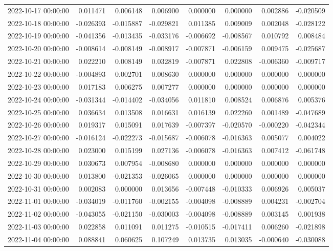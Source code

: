 \begin{tabular}{lrrrrrrr}
2022-10-17 00:00:00 & 0.011471 & 0.006148 & 0.006900 & 0.000000 & 0.000000 & 0.002886 & -0.020509 \\
2022-10-18 00:00:00 & -0.026393 & -0.015887 & -0.029821 & 0.011385 & 0.009009 & 0.002048 & -0.028122 \\
2022-10-19 00:00:00 & -0.041356 & -0.013435 & -0.033176 & -0.006692 & -0.008567 & 0.010792 & 0.008484 \\
2022-10-20 00:00:00 & -0.008614 & -0.008149 & -0.008917 & -0.007871 & -0.006159 & 0.009475 & -0.025687 \\
2022-10-21 00:00:00 & 0.022210 & 0.008149 & 0.032819 & -0.007871 & 0.022808 & -0.006360 & -0.009717 \\
2022-10-22 00:00:00 & -0.004893 & 0.002701 & 0.008630 & 0.000000 & 0.000000 & 0.000000 & 0.000000 \\
2022-10-23 00:00:00 & 0.017183 & 0.006275 & 0.007277 & 0.000000 & 0.000000 & 0.000000 & 0.000000 \\
2022-10-24 00:00:00 & -0.031344 & -0.014402 & -0.034056 & 0.011810 & 0.008524 & 0.006876 & 0.005376 \\
2022-10-25 00:00:00 & 0.036634 & 0.013508 & 0.016631 & 0.016139 & 0.022260 & 0.001489 & -0.047689 \\
2022-10-26 00:00:00 & 0.019317 & 0.015091 & 0.017639 & -0.007397 & -0.020570 & -0.000220 & -0.042344 \\
2022-10-27 00:00:00 & -0.016124 & -0.022273 & -0.015687 & -0.006078 & -0.016363 & 0.005077 & 0.004022 \\
2022-10-28 00:00:00 & 0.023000 & 0.015199 & 0.027136 & -0.006078 & -0.016363 & 0.007412 & -0.061748 \\
2022-10-29 00:00:00 & 0.030673 & 0.007954 & -0.008680 & 0.000000 & 0.000000 & 0.000000 & 0.000000 \\
2022-10-30 00:00:00 & 0.013800 & -0.021353 & -0.026065 & 0.000000 & 0.000000 & 0.000000 & 0.000000 \\
2022-10-31 00:00:00 & 0.002083 & 0.000000 & 0.013656 & -0.007448 & -0.010333 & 0.006926 & 0.005037 \\
2022-11-01 00:00:00 & -0.034019 & -0.011760 & -0.002155 & -0.004098 & -0.008889 & 0.004231 & -0.002704 \\
2022-11-02 00:00:00 & -0.043055 & -0.021150 & -0.030003 & -0.004098 & -0.008889 & 0.003145 & 0.001938 \\
2022-11-03 00:00:00 & 0.022858 & 0.011091 & 0.011275 & -0.010515 & -0.017411 & 0.006260 & -0.021898 \\
2022-11-04 00:00:00 & 0.088841 & 0.060625 & 0.107249 & 0.013735 & 0.013035 & -0.000640 & -0.030088 \\

\end{tabular}
